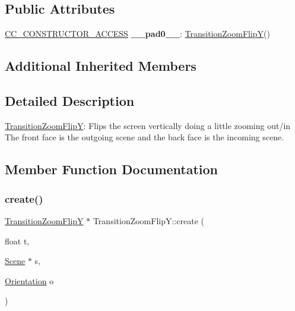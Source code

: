 \subsection*{Public Attributes}
\begin{DoxyCompactItemize}
\item 
\mbox{\label{classTransitionZoomFlipY_a7cac323cbb0215917cffba58998c8d8f}} 
\hyperlink{_2cocos2d_2cocos_2base_2ccConfig_8h_a25ef1314f97c35a2ed3d029b0ead6da0}{C\+C\+\_\+\+C\+O\+N\+S\+T\+R\+U\+C\+T\+O\+R\+\_\+\+A\+C\+C\+E\+SS} {\bfseries \+\_\+\+\_\+pad0\+\_\+\+\_\+}\+: \hyperlink{classTransitionZoomFlipY}{Transition\+Zoom\+FlipY}()
\end{DoxyCompactItemize}
\subsection*{Additional Inherited Members}


\subsection{Detailed Description}
\hyperlink{classTransitionZoomFlipY}{Transition\+Zoom\+FlipY}\+: Flips the screen vertically doing a little zooming out/in The front face is the outgoing scene and the back face is the incoming scene. 

\subsection{Member Function Documentation}
\mbox{\label{classTransitionZoomFlipY_a1082747ec2484feb7e69e09eae7f5668}} 
\subsubsection{\texorpdfstring{create()}{create()}\hspace{0.1cm}{\footnotesize\ttfamily [1/4]}}
{\footnotesize\ttfamily \hyperlink{classTransitionZoomFlipY}{Transition\+Zoom\+FlipY} $\ast$ Transition\+Zoom\+Flip\+Y\+::create (\begin{DoxyParamCaption}\item[{float}]{t,  }\item[{\hyperlink{classScene}{Scene} $\ast$}]{s,  }\item[{\hyperlink{classTransitionScene_a0b2b247806fb10a20de0cbc554210c4d}{Orientation}}]{o }\end{DoxyParamCaption})\hspace{0.3cm}{\ttfamily [static]}}

